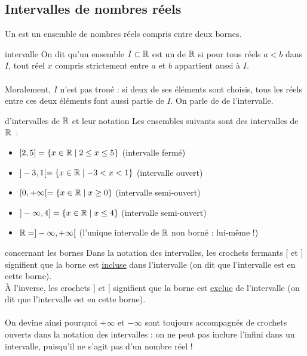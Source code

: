 \subsection{Intervalles de nombres réels} 
Un  est un ensemble de nombres réels compris entre deux bornes.
\begin{definition}{}{intervalle}
    On dit qu'un ensemble $I \subset \mathbb{R}$ est un  de $\mathbb{R}$ si pour tous réels $a<b$ dans $I$, tout réel $x$ compris strictement entre $a$ et $b$ appartient aussi à $I$. \\\\Moralement, $I$ n'est pas troué : si deux de ses éléments sont choisis, tous les réels entre ces deux éléments font aussi partie de $I$. On parle de  de l'intervalle.
\end{definition}

\begin{exemple}{}{d'intervalles de $\mathbb{R}$ et leur notation}
    Les ensembles suivants sont des intervalles de $\mathbb{R}$~:
    \begin{itemize}
        \item $[2, 5] = \{ x \in \mathbb{R} \mid 2 \leq x \leq 5 \}$ (intervalle fermé)
        \item $] -3, 1 [ = \{ x \in \mathbb{R} \mid -3 < x < 1 \}$ (intervalle ouvert)
        \item $[0, +\infty[ = \{ x \in \mathbb{R} \mid x \geq 0 \}$ (intervalle semi-ouvert)
        \item $]-\infty, 4] = \{ x \in \mathbb{R} \mid x \leq 4 \}$ (intervalle semi-ouvert)
        \item $\mathbb{R} = ]-\infty, +\infty[$ (l'unique intervalle de $\mathbb{R}$ non borné : lui-même !)
    \end{itemize}
\end{exemple}

\begin{remarque}{}{concernant les bornes}
    Dans la notation des intervalles, les crochets fermants $[$ et $]$ signifient que la borne est \underline{incluse} dans l'intervalle (on dit que l'intervalle est  en cette borne). \\
    À l'inverse, les crochets $]$ et $[$ signifient que la borne est \underline{exclue} de l'intervalle (on dit que l'intervalle est  en cette borne).\\\\
    On devine ainsi pourquoi $+\infty$ et $-\infty$ sont toujours accompagnés de crochets ouverts dans la notation des intervalles : on ne peut pas inclure l'infini dans un intervalle, puisqu'il ne s'agit pas d'un nombre réel !
\end{remarque}

